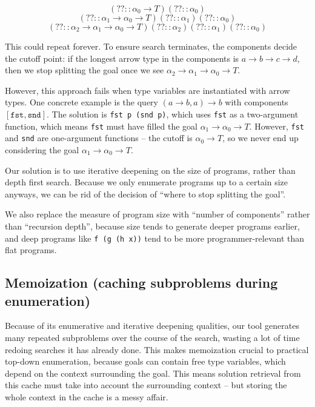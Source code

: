 \documentclass[acmsmall,nonacm]{acmart}
\begin{document}
\[ (?? :: \alpha_0 \to T) (?? :: \alpha_0) \]
\[ (?? :: \alpha_1 \to \alpha_0 \to T) (?? :: \alpha_1) (?? :: \alpha_0) \]
\[ (?? :: \alpha_2 \to \alpha_1 \to \alpha_0 \to T) (?? :: \alpha_2) (?? :: \alpha_1) (?? :: \alpha_0) \]

This could repeat forever. To ensure search terminates, the components 
decide the cutoff point: if the longest arrow type in the components is 
$a \to b \to c \to d$, then we stop splitting the goal once we see 
$\alpha_2 \to \alpha_1 \to \alpha_0 \to T$.

However, this approach fails when type variables are instantiated with 
arrow types. One concrete example is the query $(a \to b, a) \to b$ 
with components $[\texttt{fst}, \texttt{snd}]$. The solution is 
\texttt{fst p (snd p)}, which uses \texttt{fst} as a two-argument function, 
which means \texttt{fst} must have filled the goal $\alpha_1 \to \alpha_0 \to T$. 
However, \texttt{fst} and \texttt{snd} are one-argument functions -- 
the cutoff is $\alpha_0 \to T$, so we never end up considering the goal 
$\alpha_1 \to \alpha_0 \to T$.

Our solution is to use iterative deepening on the size of programs, 
rather than depth first search. Because we only enumerate programs up 
to a certain size anyways, we can be rid of the decision of ``where to 
stop splitting the goal''.

We also replace the measure of program size with ``number of components'' 
rather than ``recursion depth'', because size tends to generate deeper 
programs earlier, and deep programs like \texttt{f (g (h x))} tend to 
be more programmer-relevant than flat programs.

\subsection{Memoization (caching subproblems during enumeration)}

Because of its enumerative and iterative deepening qualities, our tool 
generates many repeated subproblems
over the course of the search, wasting a lot of time redoing searches it has
already done. This makes memoization crucial to practical 
top-down enumeration, because goals can contain free type variables, 
which depend on the context surrounding the goal. This means solution retrieval 
from this 
cache must take into account the surrounding context -- but storing the 
whole context in the cache is a messy affair.

\end{document}
